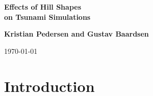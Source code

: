 \documentclass[twoside]{article}
\begin{document}






\begin{center}
{\LARGE\bf Effects of Hill Shapes \\ [1.5mm] on Tsunami Simulations}
\end{center}





\begin{center}
{\bf Kristian Pedersen and Gustav Baardsen} \\ [0mm]
\end{center}






\begin{center}
\today
\end{center}

\vspace{1cm}



\begin{abstract}

In this project we study how the shape of hills at the sea bottom
affects numerical and physical properties of simulations of
 earthquake-generated tsunamis. The tsunamis are modelled using 
two-dimensional wave equations, and a finite difference scheme is 
used to solve the partial differential equations.


\end{abstract}

\tableofcontents



\section{Introduction}
\end{document}
